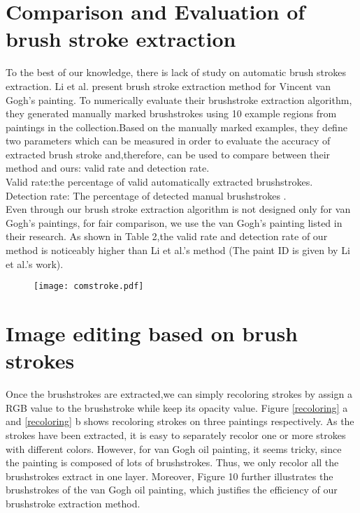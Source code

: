 \section{Comparison and Evaluation of brush stroke extraction} \label{comparevan}
To the best of our knowledge, there is lack of study on automatic brush strokes extraction. Li et al.\cite{li2012rhythmic} present brush stroke extraction method for Vincent van Gogh's painting. To numerically evaluate their brushstroke extraction algorithm, they generated manually marked brushstrokes using 10 example regions from paintings in the collection.Based on the manually marked examples, they define two parameters which can be measured in order to evaluate the accuracy of extracted brush stroke and,therefore, can be used to compare between their method and ours: valid rate and detection rate.\\
Valid rate:the percentage of valid automatically extracted brushstrokes. \\ Detection rate: The percentage of detected manual brushstrokes . \\
Even through our brush stroke extraction algorithm is not designed only for van Gogh's paintings, for fair comparison, we use the van Gogh's painting listed in their research. As shown in Table 2,the valid rate and detection rate of our method is noticeably higher than Li et al.'s method \cite{li2012rhythmic} (The paint ID is given by Li et al.'s work). 

\begin{figure}[H]
	\texttt{[image: comstroke.pdf]}
	\label{table2}
\end{figure}



\section{Image editing based on brush strokes}\label{editing}

Once the brushstrokes are extracted,we can simply recoloring strokes by assign a RGB value to the brushstroke while keep its opacity value.
Figure \ref{recoloring} a and \ref{recoloring} b shows recoloring strokes on three paintings respectively. As the strokes have been extracted, it is easy to separately recolor one or more strokes with different colors. However, for van Gogh oil painting, it seems tricky, since the painting is composed of lots of brushstrokes. Thus, we only recolor all the brushstrokes extract in one layer.
Moreover, Figure 10 further illustrates the brushstrokes of the van Gogh oil painting, which justifies the efficiency of our brushstroke extraction method.

